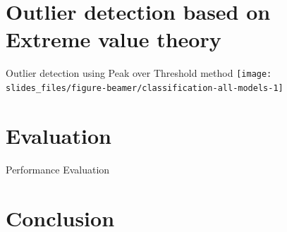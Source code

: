 \documentclass[14pt,ignorenonframetext,compress]{beamer}
\begin{document}
\hypertarget{outlier-detection-based-on-extreme-value-theory}{%
\section{Outlier detection based on Extreme value
theory}\label{outlier-detection-based-on-extreme-value-theory}}

\begin{frame}{Outlier detection using Peak over Threshold method}
\protect\hypertarget{outlier-detection-using-peak-over-threshold-method}{}
\texttt{[image: slides\_files/figure-beamer/classification-all-models-1]}
\end{frame}

\hypertarget{evaluation}{%
\section{Evaluation}\label{evaluation}}

\begin{frame}{Performance Evaluation}
\protect\hypertarget{performance-evaluation}{}
\begin{table}
\centering\begingroup\fontsize{7}{9}\selectfont

\endgroup{}
\end{table}
\end{frame}

\hypertarget{conclusion}{%
\section{Conclusion}\label{conclusion}}
\end{document}
